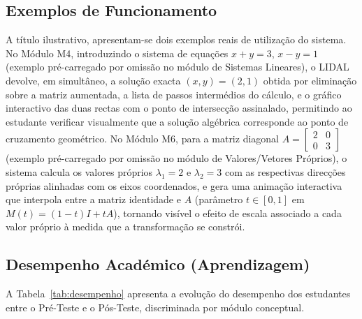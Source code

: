 \documentclass[conference]{IEEEtran}
\begin{document}
\subsection{Exemplos de Funcionamento}

A título ilustrativo, apresentam-se dois exemplos reais de utilização do sistema. No Módulo M4, introduzindo o sistema de equações $x+y=3$, $x-y=1$ (exemplo pré-carregado por omissão no módulo de Sistemas Lineares), o LIDAL devolve, em simultâneo, a solução exacta $(x,y)=(2,1)$ obtida por eliminação sobre a matriz aumentada, a lista de passos intermédios do cálculo, e o gráfico interactivo das duas rectas com o ponto de intersecção assinalado, permitindo ao estudante verificar visualmente que a solução algébrica corresponde ao ponto de cruzamento geométrico. No Módulo M6, para a matriz diagonal $A = \begin{bmatrix} 2 & 0 \\ 0 & 3 \end{bmatrix}$ (exemplo pré-carregado por omissão no módulo de Valores/Vetores Próprios), o sistema calcula os valores próprios $\lambda_1=2$ e $\lambda_2=3$ com as respectivas direcções próprias alinhadas com os eixos coordenados, e gera uma animação interactiva que interpola entre a matriz identidade e $A$ (parâmetro $t \in [0,1]$ em $M(t)=(1-t)I+tA$), tornando visível o efeito de escala associado a cada valor próprio à medida que a transformação se constrói.

\subsection{Desempenho Académico (Aprendizagem)}

A Tabela~\ref{tab:desempenho} apresenta a evolução do desempenho dos estudantes entre o Pré-Teste e o Pós-Teste, discriminada por módulo conceptual.
\end{document}
